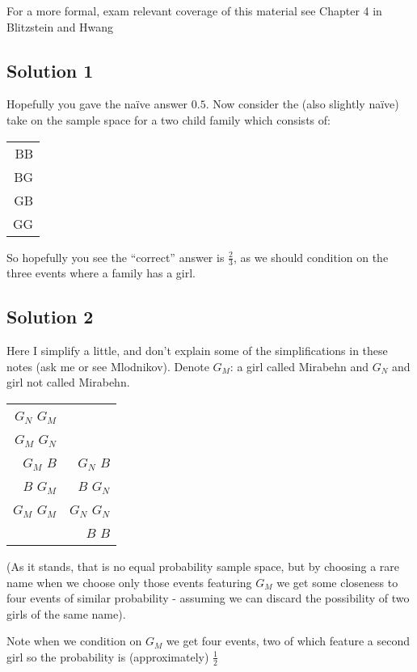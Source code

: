 \documentclass[12pt]{extbook}
\begin{document}
For a more formal, exam relevant coverage of this material see Chapter 4 in Blitzstein and Hwang

 

\subsection{Solution 1}

Hopefully you gave the na\"ive answer $0.5$.   Now consider the (also slightly na\"ive) take on the sample space for a two child family which consists of:

\begin{tabular}{r}
BB \\
{\color{red}BG} \\
{\color{red}GB}\\
{\color{red}GG}
\end{tabular}

So hopefully you see the ``correct'' answer is $\frac{2}{3}$, as we should condition on the three events where a family has a girl.

 

\subsection{Solution 2}

Here I simplify a little, and don't explain some of the simplifications in these notes (ask me or see Mlodnikov).   Denote $G_M$: a girl called Mirabehn and $G_N$ and girl not called Mirabehn.

\begin{tabular}{rr}
$G_N$ $G_M$ &  \\
$G_M$ $G_N$ &  \\
$G_M$ $B$   & $G_N$ $B$ \\
$B$ $G_M$  & $B$ $G_N$ \\
$G_M$ $G_M$ & $G_N$ $G_N$\\
 & $B$ $B$ \\
\end{tabular}

(As it stands, that is no equal probability sample space, but by choosing a rare name when we choose only those events featuring $G_M$ we get some closeness to four events of similar probability - assuming we can discard the possibility of two girls of the same name).   

Note when we condition on $G_M$ we get four events, two of which feature a second girl so the probability is (approximately) $\frac{1}{2}$
\end{document}
